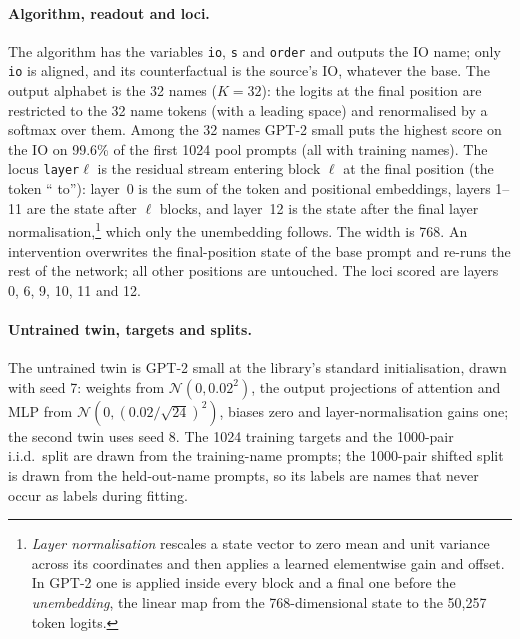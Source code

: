 \documentclass[11pt,a4paper]{article}
\begin{document}
\paragraph{Algorithm, readout and loci.} The algorithm has the variables \texttt{io}, \texttt{s} and \texttt{order} and outputs the IO name; only \texttt{io} is aligned, and its counterfactual is the source's IO, whatever the base. The output alphabet is the 32 names ($K=32$): the logits at the final position are restricted to the 32 name tokens (with a leading space) and renormalised by a softmax over them. Among the 32 names GPT-2 small puts the highest score on the IO on 99.6\% of the first 1024 pool prompts (all with training names). The locus \texttt{layer}$\ell$ is the residual stream entering block $\ell$ at the final position (the token `` to''): layer~0 is the sum of the token and positional embeddings, layers 1--11 are the state after $\ell$ blocks, and layer~12 is the state after the final layer normalisation,\footnote{\emph{Layer normalisation} rescales a state vector to zero mean and unit variance across its coordinates and then applies a learned elementwise gain and offset. In GPT-2 one is applied inside every block and a final one before the \emph{unembedding}, the linear map from the 768-dimensional state to the 50{,}257 token logits.} which only the unembedding follows. The width is 768. An intervention overwrites the final-position state of the base prompt and re-runs the rest of the network; all other positions are untouched. The loci scored are layers 0, 6, 9, 10, 11 and 12.

\paragraph{Untrained twin, targets and splits.} The untrained twin is GPT-2 small at the library's standard initialisation, drawn with seed 7: weights from $\mathcal N(0,0.02^2)$, the output projections of attention and MLP from $\mathcal N(0,(0.02/\sqrt{24})^2)$, biases zero and layer-normalisation gains one; the second twin uses seed 8. The 1024 training targets and the 1000-pair i.i.d.\ split are drawn from the training-name prompts; the 1000-pair shifted split is drawn from the held-out-name prompts, so its labels are names that never occur as labels during fitting.
\end{document}
